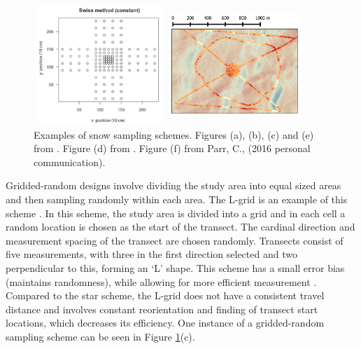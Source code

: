\documentclass{sfuthesis}
\begin{document}
\begin{figure}
\begin{minipage}[c][11cm][t]{.33\textwidth}
\end{minipage}%
\begin{minipage}[c][11cm][t]{.33\textwidth}
        \vspace*{\fill}
  \centering
    \includegraphics[width=5cm,height=4.5cm]{swiss.png}
   \par\vfill
   \includegraphics[width=5cm,height=4.5cm]{hourglass.png}
\end{minipage}
\caption{Examples of snow sampling schemes. Figures (a), (b), (c) and (e) from \cite{Shea2010}. Figure (d) from \cite{Schweizer2008}. Figure (f) from Parr, C., (2016 personal communication).}
\label{schemes}
\end{figure}

Gridded-random designs involve dividing the study area into equal sized areas and then sampling randomly within each area. The L-grid is an example of this scheme \citep{Bellaire2008, Elder2009, Bellaire2011}. In this scheme, the study area is divided into a grid and in each cell a random location is chosen as the start of the transect. The cardinal direction and measurement spacing of the transect are chosen randomly. Transects consist of five measurements, with three in the first direction selected and two perpendicular to this, forming an `L' shape. This scheme has a small error bias (maintains randomness), while allowing for more efficient measurement \citep{Shea2010}. Compared to the star scheme, the L-grid does not have a consistent travel distance and involves constant reorientation and finding of transect start locations, which decreases its efficiency. One instance of a gridded-random sampling scheme can be seen in Figure \ref{schemes}(c). 
\end{document}
